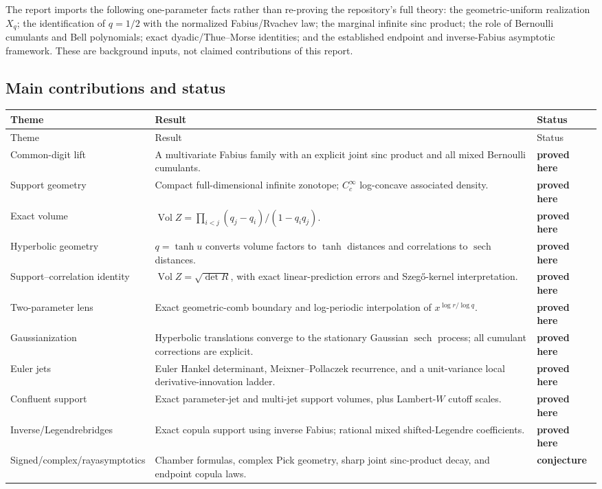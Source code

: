 \documentclass[11pt,a4paper]{article}
\theoremstyle{definition}
\theoremstyle{remark}
\newcommand{\Vol}{\operatorname{Vol}}
\newcommand{\sech}{\operatorname{sech}}
\newcommand{\statusproved}{\textcolor{deepgreen}{\textbf{proved here}}}
\newcommand{\statusconj}{\textcolor{deepred}{\textbf{conjecture}}}
\begin{document}
\begin{repobox}
The report imports the following one-parameter facts rather than re-proving the repository's full theory: the geometric-uniform realization $X_q$; the identification of $q=1/2$ with the normalized Fabius/Rvachev law; the marginal infinite sinc product; the role of Bernoulli cumulants and Bell polynomials; exact dyadic/Thue--Morse identities; and the established endpoint and inverse-Fabius asymptotic framework.  These are background inputs, not claimed contributions of this report.
\end{repobox}

\subsection{Main contributions and status}

\begin{longtable}{>{\raggedright\arraybackslash}p{}p{}>{\raggedright\arraybackslash}p{}}
\toprule
Theme & Result & Status\\
\midrule
\endfirsthead
\toprule
Theme & Result & Status\\
\midrule
\endhead
Common-digit lift & A multivariate Fabius family with an explicit joint sinc product and all mixed Bernoulli cumulants. & \statusproved\\
Support geometry & Compact full-dimensional infinite zonotope; $C_c^\infty$ log-concave associated density. & \statusproved\\
Exact volume & $\Vol Z=\prod_{i<j}(q_j-q_i)/(1-q_iq_j)$. & \statusproved\\
Hyperbolic geometry & $q=\tanh u$ converts volume factors to $\tanh$ distances and correlations to $\sech$ distances. & \statusproved\\
Support--correlation identity & $\Vol Z=\sqrt{\det R}$, with exact linear-prediction errors and Szeg\H{o}-kernel interpretation. & \statusproved\\
Two-parameter lens & Exact geometric-comb boundary and log-periodic interpolation of $x^{\log r/\log q}$. & \statusproved\\
Gaussianization & Hyperbolic translations converge to the stationary Gaussian $\sech$ process; all cumulant corrections are explicit. & \statusproved\\
Euler jets & Euler Hankel determinant, Meixner--Pollaczek recurrence, and a unit-variance local derivative-innovation ladder. & \statusproved\\
Confluent support & Exact parameter-jet and multi-jet support volumes, plus Lambert-$W$ cutoff scales. & \statusproved\\
Inverse/\allowbreak Legendre\newline bridges & Exact copula support using inverse Fabius; rational mixed shifted-Legendre coefficients. & \statusproved\\
Signed/\allowbreak complex/\allowbreak ray\newline asymptotics & Chamber formulas, complex Pick geometry, sharp joint sinc-product decay, and endpoint copula laws. & \statusconj\\
\bottomrule
\end{longtable}
\end{document}
